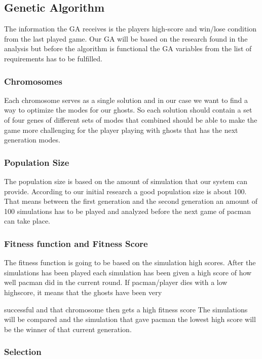 \subsection{Genetic Algorithm}

The information the GA receives is the players high-score and win/lose condition from the last played game. Our GA will be based on the research found in the analysis but before the algorithm is functional the GA variables from the list of requirements has to be fulfilled.


\subsubsection{Chromosomes}

Each chromosome serves as a single solution and in our case we want to find a way to optimize the modes for our ghosts. So each solution should contain a set of four genes of different sets of modes that combined should be able to make the game more challenging for the player playing with ghosts that has the next generation modes.

\subsubsection{Population Size}

The population size is based on the amount of simulation that our system can provide. According to our initial research a good population size is about 100. That means between the first generation and the second generation an amount of 100 simulations has to be played and analyzed before the next game of pacman can take place.


\subsubsection{Fitness function and Fitness Score}

The fitness function is going to be based on the simulation high scores. After the simulations has been played each simulation has been given a high score of how well pacman did in the current round. If pacman/player dies with a low highscore, it means that the ghosts have been very

successful and that chromosome then gets a high fitness score The simulations will be compared and the simulation that gave pacman the lowest high score will be the winner of that current generation.


\subsubsection{Selection}

